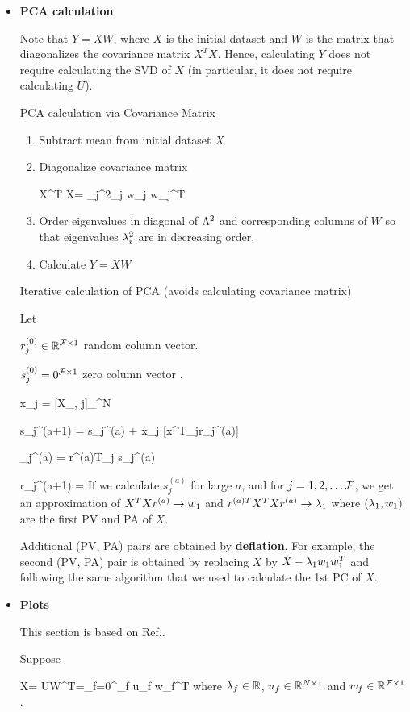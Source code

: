\begin{itemize}
\item {\bf PCA calculation}

Note that $Y=XW$, where $X$ is the initial dataset and $W$ is the matrix that diagonalizes the covariance matrix $X^T X$. Hence, calculating $Y$
does not require calculating the SVD of $X$ (in particular, it does not require calculating $U$). 

PCA calculation via Covariance Matrix
\begin{enumerate}
\item Subtract mean from initial dataset $X$
\item Diagonalize covariance matrix 

\beq
X^T X=
\sum_j\lam^2_j w_j w_j^T
\eeq
\item Order eigenvalues in diagonal of $\Lambda^2$ and corresponding columns of $W$ so that eigenvalues $\lambda^2_i$ are in decreasing order.
\item Calculate $Y= XW$
\end{enumerate}

Iterative calculation of PCA
(avoids calculating covariance matrix)

Let 

$r^{(0)}_j\in { \mathbb{R}}^{{\cal F} \times 1}$ random column vector. 

$s^{(0)}_j=0^{{\cal F} \times 1}$ zero column vector .


\beq
x_j = [X_{\s, j}]_{}^N
\;\; 
\eeq

\beq
s_{j}^{(a+1)} = s_j^{(a)} + x_j  [x^T_jr_j^{(a)}] 
\eeq


\beq
\lam_j^{(a)} = r^{(a)T}_j s_j^{(a)}
\eeq

\beq
r_{j}^{(a+1)} =
\eeq
If we calculate $s_j^{(a)}$ for large $a$, and for $j=1, 2, \ldots {\cal F}$, we get an approximation of
$X^T X r^{(a)}\rightarrow w_1$ and 
$r^{(a)T}X^T X r^{(a)}\rightarrow \lambda_1$ where
$(\lambda_1, w_1)$ are the first PV and PA of $X$.

Additional (PV, PA) pairs are obtained by {\bf deflation}. 
For example, the second (PV, PA) pair is obtained by 
replacing $X$ by $X -\lambda_1 w_1 w_1^T$ and following the same algorithm that we used to
calculate the 1st PC of $X$.

\item {\bf Plots}

This section is based on Ref.\cite{wiki-biplot}.

Suppose 

\beq
X= U\Lam W^T=\sum_{f=0}^{\calf}\lam_f u_f w_f^T
\eeq
where $\lambda_f\in { \mathbb{R}}$, $u_f\in { \mathbb{R}}^{N\times 1}$
and $w_f\in { \mathbb{R}}^{{\cal F}\times 1}$. 
 

\end{itemize}
